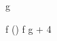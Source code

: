 \documentclass[12pt,a4paper]{book}
\begin{document}


\begin{eqcode}{g}{ }{ }{}
   \lend
\end{eqcode}

\begin{eqcode}{\mu}{ }{ }{}
  f \in (\to {}) \lend
  f \gets g + 4 \lend %
   \lend
\end{eqcode}
\end{document}
